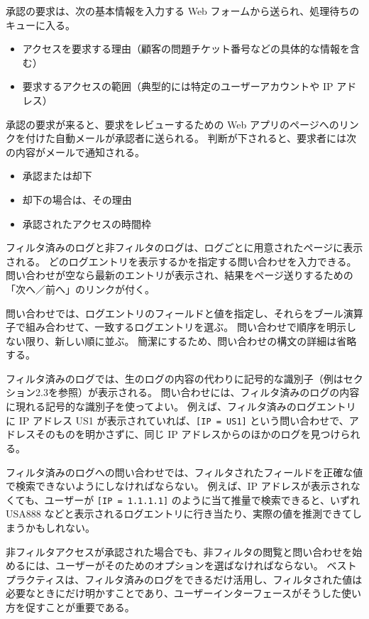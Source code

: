 \documentclass[uplatex]{jsarticle}
\def\label#1{}%
\begin{document}
承認の要求は、次の基本情報を入力する Web フォームから送られ、処理待ちのキューに入る。
\begin{itemize}
\item アクセスを要求する理由（顧客の問題チケット番号などの具体的な情報を含む）
\item 要求するアクセスの範囲（典型的には特定のユーザーアカウントや IP アドレス）
\end{itemize}

承認の要求が来ると、要求をレビューするための Web アプリのページへのリンクを付けた自動メールが承認者に送られる。
判断が下されると、要求者には次の内容がメールで通知される。
\begin{itemize}
\item 承認または却下
\item 却下の場合は、その理由
\item 承認されたアクセスの時間枠
\end{itemize}

フィルタ済みのログと非フィルタのログは、ログごとに用意されたページに表示される。
どのログエントリを表示するかを指定する問い合わせを入力できる。
問い合わせが空なら最新のエントリが表示され、結果をページ送りするための「次へ／前へ」のリンクが付く。

問い合わせでは、ログエントリのフィールドと値を指定し、それらをブール演算子で組み合わせて、一致するログエントリを選ぶ。
問い合わせで順序を明示しない限り、新しい順に並ぶ。
簡潔にするため、問い合わせの構文の詳細は省略する。

フィルタ済みのログでは、生のログの内容の代わりに記号的な識別子（例はセクション2.3を参照）が表示される。
問い合わせには、フィルタ済みのログの内容に現れる記号的な識別子を使ってよい。
例えば、フィルタ済みのログエントリに IP アドレス US1 が表示されていれば、\verb|[IP = US1]| という問い合わせで、アドレスそのものを明かさずに、同じ IP アドレスからのほかのログを見つけられる。

\begin{rem}[フィルタ済みフィールドに対する完全一致検索の禁止]\label{rem:appa-no-exact-search}
フィルタ済みのログへの問い合わせでは、フィルタされたフィールドを正確な値で検索できないようにしなければならない。
例えば、IP アドレスが表示されなくても、ユーザーが \verb|[IP = 1.1.1.1]| のように当て推量で検索できると、いずれ USA888 などと表示されるログエントリに行き当たり、実際の値を推測できてしまうかもしれない。
\end{rem}

非フィルタアクセスが承認された場合でも、非フィルタの閲覧と問い合わせを始めるには、ユーザーがそのためのオプションを選ばなければならない。
ベストプラクティスは、フィルタ済みのログをできるだけ活用し、フィルタされた値は必要なときにだけ明かすことであり、ユーザーインターフェースがそうした使い方を促すことが重要である。
\end{document}
